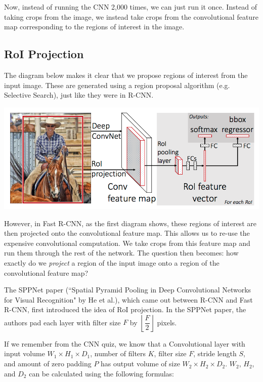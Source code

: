 \documentclass{article}
\def\lc{\left\lfloor}
\def\rc{\right\rfloor}
\begin{document}
Now, instead of running the CNN 2,000 times, we can just run it once. Instead of taking crops from the image, we instead take crops from the convolutional feature map corresponding to the regions of interest in the image.

\subsection{RoI Projection}
The diagram below makes it clear that we propose regions of interest from the input image. These are generated using a region proposal algorithm (e.g. Selective Search), just like they were in R-CNN.

\begin{center}
\includegraphics[scale=0.55]{fast-rcnn-arch.png}
\end{center}

However, in Fast R-CNN, as the first diagram shows, these regions of interest are then projected onto the convolutional feature map. This allows us to re-use the expensive convolutional computation. We take crops from this feature map and run them through the rest of the network. The question then becomes: how exactly do we \textit{project} a region of the input image onto a region of the convolutional feature map?

The SPPNet paper (``Spatial Pyramid Pooling in Deep Convolutional
Networks for Visual Recognition" by He et al.), which came out between R-CNN and Fast R-CNN, first introduced the idea of RoI projection. In the SPPNet paper, the authors pad each layer with filter size $F$ by $\lc \dfrac{F}{2} \rc$ pixels.

If we remember from the CNN quiz, we know that a Convolutional layer with input volume $W_1 \times H_1 \times D_1$, number of filters $K$, filter size $F$, stride length $S$, and amount of zero padding $P$ has output volume of size $W_2 \times H_2 \times D_2$. $W_2$, $H_2$, and $D_2$ can be calculated using the following formulas:
\end{document}
